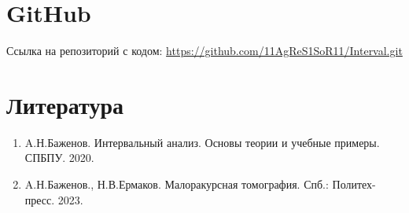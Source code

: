 \documentclass[a4paper,12pt]{article}
\begin{document}
\section{GitHub}
Ссылка на репозиторий с кодом: \url{https://github.com/11AgReS1SoR11/Interval.git} \\


\section{Литература}
\begin{enumerate}
    \item A.Н.Баженов. Интервальный анализ. Основы теории и учебные примеры. СПБПУ. 2020.
    \item A.Н.Баженов., Н.В.Ермаков. Малоракурсная томография. Спб.: Политех-пресс. 2023.
\end{enumerate}
\end{document}
